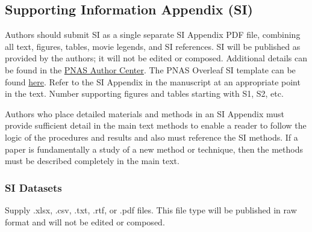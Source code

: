 \documentclass[9pt,twocolumn,twoside]{pnas-new}
\begin{document}





\subsection*{Supporting Information Appendix (SI)}

Authors should submit SI as a single separate SI Appendix PDF file, combining all text, figures, tables, movie legends, and SI references. SI will be published as provided by the authors; it will not be edited or composed. Additional details can be found in the \href{https://www.pnas.org/authors/submitting-your-manuscript#manuscript-formatting-guidelines}{PNAS Author Center}. The PNAS Overleaf SI template can be found \href{https://www.overleaf.com/latex/templates/pnas-template-for-supplementary-information/wqfsfqwyjtsd}{here}. Refer to the SI Appendix in the manuscript at an appropriate point in the text. Number supporting figures and tables starting with S1, S2, etc.

Authors who place detailed materials and methods in an SI Appendix must provide sufficient detail in the main text methods to enable a reader to follow the logic of the procedures and results and also must reference the SI methods. If a paper is fundamentally a study of a new method or technique, then the methods must be described completely in the main text.

\subsubsection*{SI Datasets}

Supply .xlsx, .csv, .txt, .rtf, or .pdf files. This file type will be published in raw format and will not be edited or composed.
\end{document}
